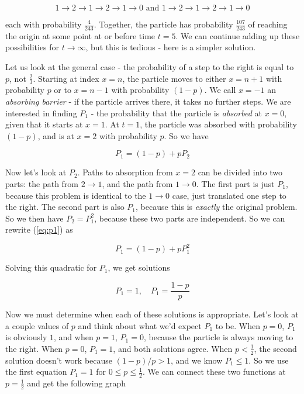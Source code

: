 \documentclass[11pt]{article}
\begin{document}
\begin{equation}
1 \to 2 \to 1 \to 2 \to 1 \to 0 \text{ and } 1 \to 2 \to 1 \to 2 \to 1 \to 0
\end{equation}

\noindent each with probability $\frac{4}{243}$. Together, the particle has probability $\frac{107}{243}$ of reaching the origin at some point at or before time $t = 5$. We can continue adding up these possibilities for $t \to \infty$, but this is tedious - here is a simpler solution.

Let us look at the general case - the probability of a step to the right is equal to $p$, not $\frac{2}{3}$. Starting at index $x = n$, the particle moves to either $x = n+1$ with probability $p$ or to $x = n-1$ with probability $(1-p)$. We call $x = -1$ an \textit{absorbing barrier} - if the particle arrives there, it takes no further steps. We are interested in finding $P_{1}$ - the probability that the particle is \textit{absorbed} at $x = 0$, given that it starts at $x = 1$. At $t = 1$, the particle was absorbed with probability $(1 - p)$, and is at $x = 2$ with probability $p$. So we have

\begin{equation}
P_{1} = (1 - p) + pP_{2}
\label{eq:p1}
\end{equation}

Now let's look at $P_{2}$. Paths to absorption from $x = 2$ can be divided into two parts: the path from $2 \to 1$, and the path from $1 \to 0$. The first part is just $P_{1}$, because this problem is identical to the $1 \to 0$ case, just translated one step to the right. The second part is also $P_{1}$, because this is \textit{exactly} the original problem. So we then have $P_{2} = P_{1}^{2}$, because these two parts are independent. So we can rewrite (\ref{eq:p1}) as

\begin{equation}
P_{1} = (1 - p) + pP_{1}^{2}
\end{equation}

\noindent Solving this quadratic for $P_{1}$, we get solutions

\begin{equation}
P_{1} = 1, \quad P_{1} = \frac{1 - p}{p}
\end{equation}

Now we must determine when each of these solutions is appropriate. Let's look at a couple values of $p$ and think about what we'd expect $P_{1}$ to be. When $p = 0$, $P_{1}$ is obviously $1$, and when $p = 1$, $P_{1} = 0$, because the particle is always moving to the right. When $p = 0$, $P_{1} = 1$, and both solutions agree. When $p < \frac{1}{2}$, the second solution doesn't work because $(1-p)/p > 1$, and we know $P_{1} \le 1$. So we use the first equation $P_{1} = 1$ for $0 \le p \le \frac{1}{2}$. We can connect these two functions at $p = \frac{1}{2}$ and get the following graph
\end{document}
